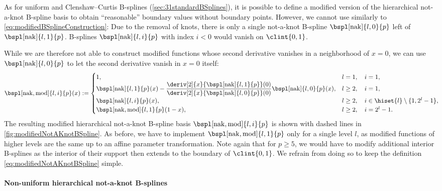 As for uniform and Clenshaw--Curtis B-splines
(\cref{sec:31standardBSplines}),
it is possible to define a modified version of the
hierarchical not-a-knot B-spline basis to obtain
``reasonable'' boundary values without boundary points.
However, we cannot use  similarly to
\eqref{eq:modifiedBSplineConstruction}:
Due to the removal of knots, there is only a single
not-a-knot B-spline $\bspl[\nak]{l,0}{p}$ left of
$\bspl[\nak]{l,1}{p}$.
B-splines $\bspl[\nak]{l,i}{p}$ with index $i < 0$
would vanish on $\clint{0, 1}$.

While we are therefore not able to construct modified functions
whose second derivative vanishes in a neighborhood of $x = 0$,
we can use $\bspl[\nak]{l,0}{p}$ to let the
second derivative vanish in $x = 0$ itself:
\begin{equation}
  \label{eq:modifiedNotAKnotBSpline}
  \bspl[\nak,\modified]{l,i}{p}(x)
  :=
  \begin{cases}
    1,&
    l = 1,\quad i = 1,\\
    \bspl[\nak]{l,1}{p}(x)
    - \dfrac{\deriv[2]{x}{\bspl[\nak]{l,1}{p}}(0)}%
    {\deriv[2]{x}{\bspl[\nak]{l,0}{p}}(0)}
    \bspl[\nak]{l,0}{p}(x),&
    l \ge 2,\quad i = 1,\\
    \bspl[\nak]{l,i}{p}(x),&
    l \ge 2,\quad i \in \hiset{l} \setminus \{1, 2^l - 1\},\\
    \bspl[\nak,\modified]{l,1}{p}(1 - x),&
    l \ge 2,\quad i = 2^l - 1.
  \end{cases}
  \hspace*{-2mm}
\end{equation}
The resulting modified hierarchical not-a-knot B-spline basis
$\bspl[\nak,\modified]{l,i}{p}$ is shown with dashed lines
in \cref{fig:modifiedNotAKnotBSpline}.
As before, we have to implement $\bspl[\nak,\modified]{l,1}{p}$
only for a single level $l$, as modified functions of higher levels
are the same up to an affine parameter transformation.
Note again that for $p \ge 5$, we would have to modify additional
interior B-splines as the interior of their support then extends to the
boundary of $\clint{0, 1}$.
We refrain from doing so to keep the definition
\eqref{eq:modifiedNotAKnotBSpline} simple.

\paragraph{Non-uniform hierarchical not-a-knot B-splines}

